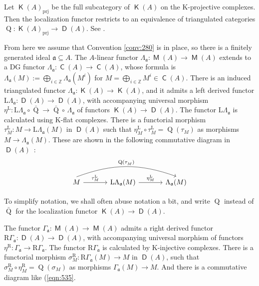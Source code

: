 \documentclass[10pt]{amsart}
\theoremstyle{definition}
\numberwithin{equation}{section}
\newcommand{\sub}{\subseteq}
\newcommand{\opn}{\operatorname}
\newcommand{\cat}[1]{\operatorname{\mathsf{#1}}}
\newcommand{\mfrak}[1]{\mathfrak{#1}}
\newcommand{\mrm}[1]{\mathrm{#1}}
\newcommand{\Ga}{\Gamma}
\newcommand{\si}{\sigma}
\newcommand{\La}{\Lambda}
\renewcommand{\a}{\mfrak{a}}
\newcommand{\Z}{\mathbb{Z}}
\newcommand{\tup}[1]{\textrm{#1}}
\newcommand{\boplus}{\bigoplus\nolimits}
\begin{document}
Let $\cat{K}(A)_{\tup{prj}}$ be the full subcategory of $\cat{K}(A)$ on the
K-projective complexes. Then the localization functor restricts to an
equivalence of triangulated categories
$\opn{Q} : \cat{K}(A)_{\tup{prj}} \to \cat{D}(A)$.
See \cite[Corollary 10.2.11]{Ye5}.

From here we assume that Convention \ref{conv:280} is in place,
so there is a finitely generated ideal $\a \sub A$.
The $A$-linear functor $\La_{\a} : \cat{M}(A) \to \cat{M}(A)$
extends to a DG functor
$\La_{\a} : \cat{C}(A) \to \cat{C}(A)$,
whose formula is
$\La_{\a}(M) := \boplus_{i \in \Z} \La_{\a}(M^i)$
for $M = \boplus_{i \in \Z} M^i \in \cat{C}(A)$.
There is an induced triangulated functor
$\La_{\a} : \cat{K}(A) \to \cat{K}(A)$,
and it admits a left derived functor
$\mrm{L} \La_{\a} : \cat{D}(A) \to \cat{D}(A)$,
with accompanying universal morphism
$\eta^{\mrm{L}} : \mrm{L} \La_{\a} \circ \bar{\opn{Q}} \to \bar{\opn{Q}} \circ
\, \La_{\a}$
of functors
$\cat{K}(A) \to \cat{D}(A)$.
The functor $\mrm{L} \La_{\a}$ is calculated using K-flat complexes.
There is a functorial morphism $\tau^{\mrm{L}}_M : M \to \mrm{L} \La_{\a}(M)$
in $\cat{D}(A)$ such that
$\eta^{\mrm{L}}_M \circ \tau^{\mrm{L}}_M = \opn{Q}(\tau_M)$ as morphisms
$M \to \La_{\a}(M)$.
These are shown in the following commutative diagram in $\cat{D}(A)$~:
\begin{equation} \label{eqn:535}
\begin{tikzcd} [column sep = 8ex, row sep = 6ex]
M
\ar[r, "{\tau^{\mrm{L}}_{M}}"]
\arrow[rr, bend left = 20, start  anchor = north,
end  anchor = north,  "{\opn{Q}(\tau^{}_{M})}"]
&
\mrm{L} \La_{\a}(M)
\ar[r, "{\eta^{\mrm{L}}_{M}}"]
&
\La_{\a}(M)
\end{tikzcd}
\end{equation}

To simplify notation, we shall often abuse notation a bit,
and write $\opn{Q}$ instead of $\bar{\opn{Q}}$ for the localization functor
$\cat{K}(A) \to \cat{D}(A)$.

The functor $\Ga_{\a} : \cat{M}(A) \to \cat{M}(A)$
admits a right derived functor
$\mrm{R} \Ga_{\a} : \cat{D}(A) \to \cat{D}(A)$,
with accompanying universal morphism of functors
$\eta^{\mrm{R}} : \Ga_{\a} \to \mrm{R} \Ga_{\a}$.
The functor $\mrm{R} \Ga_{\a}$ is calculated by K-injective complexes.
There is a functorial morphism
$\si^{\mrm{R}}_M : \mrm{R} \Ga_{\a}(M) \to M$
in $\cat{D}(A)$, such that
$\si^{\mrm{R}}_M \circ \eta^{\mrm{R}}_M = \opn{Q}(\si_M)$
as morphisms $\Ga_{\a}(M) \to M$. And there is a commutative diagram
like (\ref{eqn:535}.
\end{document}
